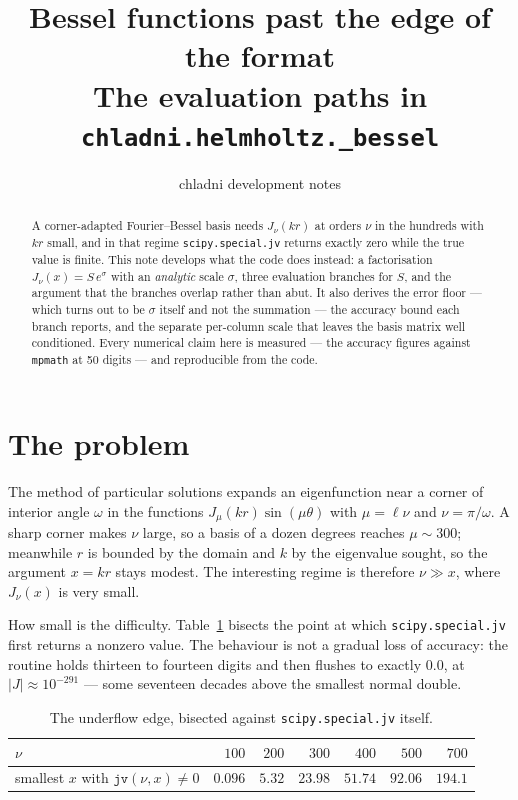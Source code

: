 \documentclass[11pt]{article}
\title{Bessel functions past the edge of the format\\
\large The evaluation paths in \texttt{chladni.helmholtz.\_bessel}}
\author{chladni development notes}
\date{}
\theoremstyle{remark}
\newcommand{\code}[1]{\texttt{#1}}
\begin{document}
\maketitle

\begin{abstract}
\noindent
A corner-adapted Fourier--Bessel basis needs $J_\nu(kr)$ at orders $\nu$ in the hundreds
with $kr$ small, and in that regime \code{scipy.special.jv} returns exactly zero while the
true value is finite. This note develops what the code does instead: a factorisation
$J_\nu(x)=S\,e^{\sigma}$ with an \emph{analytic} scale $\sigma$, three evaluation branches
for $S$, and the argument that the branches overlap rather than abut. It also derives the
error floor --- which turns out to be $\sigma$ itself and not the summation --- the
accuracy bound each branch reports, and the separate per-column scale that leaves the basis
matrix well conditioned. Every numerical
claim here is measured --- the accuracy figures against \code{mpmath} at 50 digits --- and
reproducible from the code.
\end{abstract}

\section{The problem}

The method of particular solutions expands an eigenfunction near a corner of interior angle
$\omega$ in the functions $J_{\mu}(kr)\sin(\mu\theta)$ with $\mu=\ell\nu$ and
$\nu=\pi/\omega$. A sharp corner makes $\nu$ large, so a basis of a dozen degrees reaches
$\mu\sim 300$; meanwhile $r$ is bounded by the domain and $k$ by the eigenvalue sought, so
the argument $x=kr$ stays modest. The interesting regime is therefore $\nu\gg x$, where
$J_\nu(x)$ is very small.

How small is the difficulty. Table~\ref{tab:cliff} bisects the point at which
\code{scipy.special.jv} first returns a nonzero value. The behaviour is not a gradual loss
of accuracy: the routine holds thirteen to fourteen digits and then flushes to exactly
$0.0$, at $|J|\approx10^{-291}$ --- some seventeen decades above the smallest normal double.

\begin{table}[h]
\centering
\begin{tabular}{lrrrrrr}
\toprule
$\nu$ & $100$ & $200$ & $300$ & $400$ & $500$ & $700$\\
\midrule
smallest $x$ with $\code{jv}(\nu,x)\neq 0$ & $0.096$ & $5.32$ & $23.98$ & $51.74$ & $92.06$ & $194.1$\\
\bottomrule
\end{tabular}
\caption{The underflow edge, bisected against \code{scipy.special.jv} itself.}
\label{tab:cliff}
\end{table}
\end{document}
